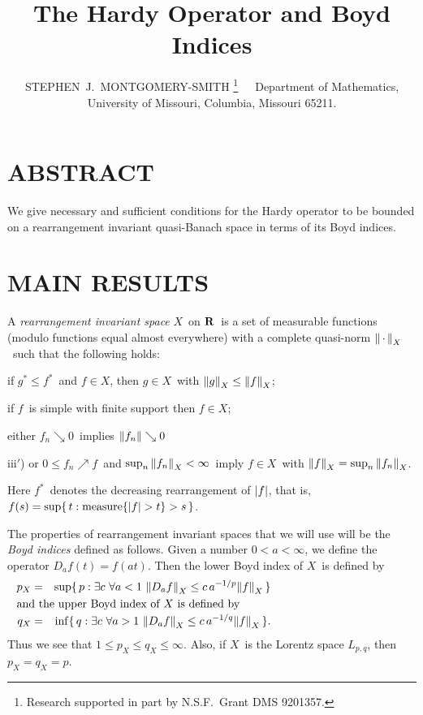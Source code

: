 \let\itemi\item
\let\itemii\item
\let\itemiii\item
\let\itemiv\item



\title{The Hardy Operator and Boyd Indices}

\author{\uppercase{Stephen~J.~Montgomery-Smith}%
\thanks{Research supported in part by N.S.F.\ Grant
DMS 9201357.}\ \ \
Department of Mathematics, University of Missouri,
Columbia, Missouri 65211.}

\maketitle

\thispagestyle{empty}
\pagestyle{empty}

\section*{ABSTRACT}

We give necessary and sufficient conditions for the
Hardy operator to be bounded on a rearrangement invariant quasi-Banach
space in terms of its Boyd indices.

\section*{MAIN RESULTS}

A {\it rearrangement invariant space\/} $X$\ on ${\bf R}$\ is a 
set of measurable
functions (modulo functions equal almost everywhere) with a 
complete quasi-norm ${\left\| \,\cdot\, \right\|}_X$\
such that the following holds:
\begin{itemlist}
\itemi if $g^* \le f^*$\ and $f \in X$, then $g \in X$\ with
${\mathopen\| g \mathclose\|}_X \le {\mathopen\| f \mathclose\|}_X$;
\itemii if $f$\ is simple with finite support then $f \in X$;
\itemiii either $f_n \searrow 0$\ implies ${\mathopen\| f_n \mathclose\|} \searrow 0$
\item[iii$'$)] or $0 \le f_n \nearrow f$\ and $\sup_n {\mathopen\| f_n \mathclose\|}_X < \infty$\
imply $f \in X$\ with ${\mathopen\| f \mathclose\|}_X = \sup_n {\mathopen\| f_n \mathclose\|}_X$.
\end{itemlist}

\noindent
Here $f^*$\ denotes the decreasing rearrangement of ${\mathopen| f \mathclose|}$, that is,
$f(s) = \sup\{ \,t : \mathop{\hbox{measure}}\{ {\mathopen| f \mathclose|} > t\} > s \, \}$.


The properties of rearrangement invariant spaces that we will use will be
the {\it Boyd indices\/} defined as follows.  Given a number $0<a<\infty$,
we define the operator $D_a f(t) = f(at)$.  Then the lower Boyd index
of $X$\ is defined by
\begin{eqnarray*}
   p_X &=& \sup\{\, p : \exists c \ \forall a<1 \ \snormo{D_a f}_X \le c \,
   a^{-1/p} \snormo f_X \, \} \\
\noalign{\noindent and the upper Boyd index of $X$\ is defined by}
   q_X &=& \inf\{\, q : \exists c \ \forall a>1 \ \snormo{D_a f}_X \le c \,
   a^{-1/q} \snormo f_X \, \} .
\end{eqnarray*}
Thus we see that $1 \le p_X \le q_X \le \infty$.  Also, if $X$\ is the
Lorentz space $L_{p,q}$, then $p_X = q_X = p$.

